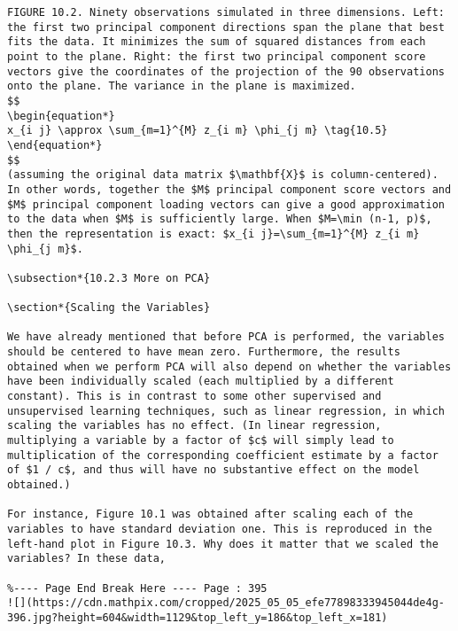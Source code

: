 \documentclass[10pt]{article}
\begin{document}
\begin{verbatim}
FIGURE 10.2. Ninety observations simulated in three dimensions. Left: the first two principal component directions span the plane that best fits the data. It minimizes the sum of squared distances from each point to the plane. Right: the first two principal component score vectors give the coordinates of the projection of the 90 observations onto the plane. The variance in the plane is maximized.
$$
\begin{equation*}
x_{i j} \approx \sum_{m=1}^{M} z_{i m} \phi_{j m} \tag{10.5}
\end{equation*}
$$
(assuming the original data matrix $\mathbf{X}$ is column-centered). In other words, together the $M$ principal component score vectors and $M$ principal component loading vectors can give a good approximation to the data when $M$ is sufficiently large. When $M=\min (n-1, p)$, then the representation is exact: $x_{i j}=\sum_{m=1}^{M} z_{i m} \phi_{j m}$.

\subsection*{10.2.3 More on PCA}

\section*{Scaling the Variables}

We have already mentioned that before PCA is performed, the variables should be centered to have mean zero. Furthermore, the results obtained when we perform PCA will also depend on whether the variables have been individually scaled (each multiplied by a different constant). This is in contrast to some other supervised and unsupervised learning techniques, such as linear regression, in which scaling the variables has no effect. (In linear regression, multiplying a variable by a factor of $c$ will simply lead to multiplication of the corresponding coefficient estimate by a factor of $1 / c$, and thus will have no substantive effect on the model obtained.)

For instance, Figure 10.1 was obtained after scaling each of the variables to have standard deviation one. This is reproduced in the left-hand plot in Figure 10.3. Why does it matter that we scaled the variables? In these data,

%---- Page End Break Here ---- Page : 395
![](https://cdn.mathpix.com/cropped/2025_05_05_efe77898333945044de4g-396.jpg?height=604&width=1129&top_left_y=186&top_left_x=181)


\end{verbatim}
\end{document}
